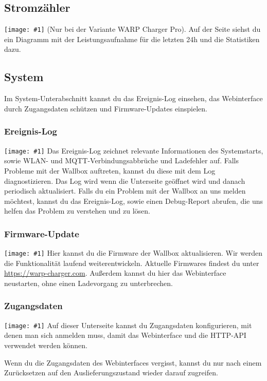 \documentclass[a4paper,10pt]{article}
\newcommand{\hint}[1]{\begin{tcolorbox}[colback=boxgray,colframe=black,coltext=
white,title=Hinweis]#1\end{tcolorbox}}
\newcommand{\gfx}[1]{\texttt{[image: \#1]}}
\begin{document}
\begin{multicols*}{2}
	\subsection{Stromzähler}
	\gfx{./img_warp2/resized/web_meter}
	(Nur bei der Variante WARP Charger Pro). Auf der Seite
	siehst du ein Diagramm mit der Leistungsaufnahme für die letzten 24h und die
	Statistiken dazu.

	\subsection{System}
	Im System-Unterabschnitt kannst du das Ereignis-Log einsehen, das Webinterface durch Zugangsdaten schützen und Firmware-Updates einspielen.
	\subsubsection{Ereignis-Log}
	\gfx{./img_warp2/resized/web_event_log}
	Das Ereignis-Log zeichnet relevante Informationen des Systemstarts, sowie WLAN- und MQTT-Verbindungsabbrüche und Ladefehler auf.
	Falls Probleme mit der Wallbox auftreten, kannst du diese mit dem Log diagnostizieren.
	Das Log wird wenn die Unterseite geöffnet wird und danach periodisch aktualisiert.
	Falls du ein Problem mit der Wallbox an uns melden möchtest, kannst du das Ereignis-Log,
	sowie einen Debug-Report abrufen, die uns helfen das Problem zu verstehen und zu lösen.

	\subsubsection{Firmware-Update}
	\gfx{./img_warp2/resized/web_firmware_update}
	Hier kannst du die Firmware der Wallbox aktualisieren. Wir werden die Funktionalität
	laufend weiterentwickeln. Aktuelle Firmwares findest du unter \url{https://warp-charger.com}.
	Außerdem kannst du hier das Webinterface neustarten, ohne einen Ladevorgang zu unterbrechen.

	\subsubsection{Zugangsdaten}
	\gfx{./img_warp2/resized/web_authentication}
	Auf dieser Unterseite kannst du Zugangsdaten konfigurieren, mit denen man sich anmelden muss,
	damit das Webinterface und die HTTP-API verwendet werden können.
	\hint{Wenn du die Zugangsdaten des Webinterfaces vergisst, kannst du nur nach einem Zurücksetzen
	auf den Auslieferungszustand wieder darauf zugreifen.}


\end{multicols*}
\end{document}
